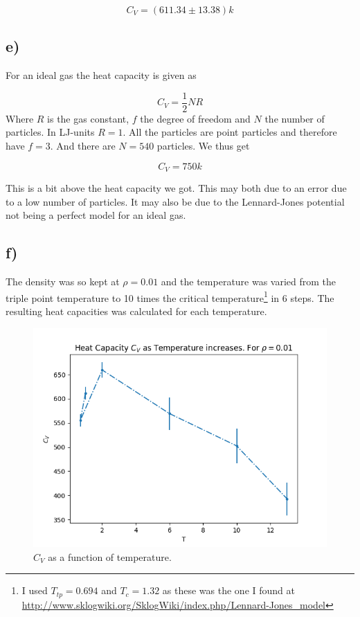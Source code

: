 \documentclass[a4paper,norsk, 10pt]{article}
\begin{document}
\begin{equation}
C_V = (611.34 \pm 13.38) k
\end{equation}


\subsection{e)}
For an ideal gas the heat capacity is given as

\begin{equation}
C_V = \frac{1}{2}NR
\end{equation}
Where $R$ is the gas constant, $f$ the degree of freedom and $N$ the number of particles. In LJ-units $R = 1$. All the particles are point particles and therefore have $f = 3$. And there are $N = 540$ particles. We thus get

\begin{equation}
C_V = 750 k
\end{equation}

This is a bit above the heat capacity we got. This may both due to an error due to a low number of particles. It may also be due to the Lennard-Jones potential not being a perfect model for an ideal gas.


\subsection{f)}
The density was so kept at $\rho = 0.01$ and the temperature was varied from the triple point temperature to 10 times the critical temperature\footnote{I used $T_{tp} = 0.694$ and $T_c = 1.32$ as these was the one I found at \url{http://www.sklogwiki.org/SklogWiki/index.php/Lennard-Jones_model}} in 6 steps. The resulting heat capacities was calculated for each temperature.

\begin{figure}[H]
\centering
\includegraphics[scale=0.5]{CVvsT.png}
\caption{$C_V$ as a function of temperature.}
\label{fig:isoTherm}
\end{figure}
\end{document}
